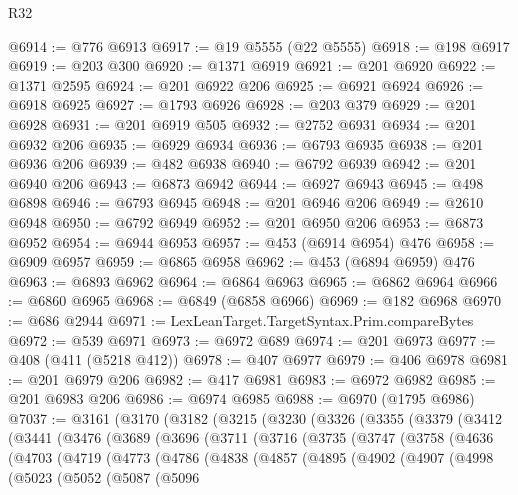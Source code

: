 \begin{lexlean}{R32}
\begin{coremodule}
@6914 := @776 @6913
@6917 := @19 @5555 (@22 @5555)
@6918 := @198 @6917
@6919 := @203 @300
@6920 := @1371 @6919
@6921 := @201 @6920
@6922 := @1371 @2595
@6924 := @201 @6922 @206
@6925 := @6921 @6924
@6926 := @6918 @6925
@6927 := @1793 @6926
@6928 := @203 @379
@6929 := @201 @6928
@6931 := @201 @6919 @505
@6932 := @2752 @6931
@6934 := @201 @6932 @206
@6935 := @6929 @6934
@6936 := @6793 @6935
@6938 := @201 @6936 @206
@6939 := @482 @6938
@6940 := @6792 @6939
@6942 := @201 @6940 @206
@6943 := @6873 @6942
@6944 := @6927 @6943
@6945 := @498 @6898
@6946 := @6793 @6945
@6948 := @201 @6946 @206
@6949 := @2610 @6948
@6950 := @6792 @6949
@6952 := @201 @6950 @206
@6953 := @6873 @6952
@6954 := @6944 @6953
@6957 := @453 (@6914 @6954) @476
@6958 := @6909 @6957
@6959 := @6865 @6958
@6962 := @453 (@6894 @6959) @476
@6963 := @6893 @6962
@6964 := @6864 @6963
@6965 := @6862 @6964
@6966 := @6860 @6965
@6968 := @6849 (@6858 @6966)
@6969 := @182 @6968
@6970 := @686 @2944
@6971 := LexLeanTarget.TargetSyntax.Prim.compareBytes
@6972 := @539 @6971
@6973 := @6972 @689
@6974 := @201 @6973
@6977 := @408 (@411 (@5218 @412))
@6978 := @407 @6977
@6979 := @406 @6978
@6981 := @201 @6979 @206
@6982 := @417 @6981
@6983 := @6972 @6982
@6985 := @201 @6983 @206
@6986 := @6974 @6985
@6988 := @6970 (@1795 @6986)
@7037 := @3161
    (@3170
      (@3182
        (@3215
          (@3230
            (@3326
              (@3355
                (@3379
                  (@3412
                    (@3441
                      (@3476
                        (@3689
                          (@3696
                            (@3711
                              (@3716
                                (@3735
                                  (@3747
                                    (@3758
                                      (@4636
                                        (@4703
                                          (@4719
                                            (@4773
                                              (@4786
                                                (@4838
                                                  (@4857
                                                    (@4895
                                                      (@4902
                                                        (@4907
                                                          (@4998
                                                            (@5023
                                                              (@5052
                                                                (@5087
                                                                  (@5096

\end{coremodule}
\end{lexlean}
